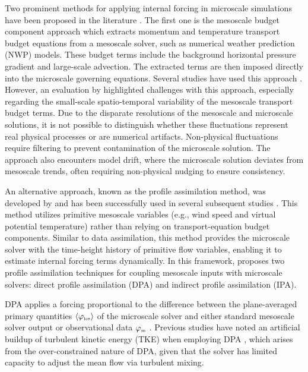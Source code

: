 Two prominent methods for applying internal forcing in microscale simulations have been proposed in the literature \citep{allaerts2020development}. The first one is the mesoscale budget component approach which extracts momentum and temperature transport budget equations from a mesoscale solver, such as numerical weather prediction (NWP) models. These budget terms include the background horizontal pressure gradient and large-scale advection. The extracted terms are then imposed directly into the microscale governing equations. Several studies have used this approach \citep{baas2010design,neggers2012continuous,schalkwijk2015year,heinze2017evaluation,sanz2017methodology,olsen2018mesoscale}. However, an evaluation by \citet{draxl2021coupling} highlighted challenges with this approach, especially regarding the small-scale spatio-temporal variability of the mesoscale transport budget terms. Due to the disparate resolutions of the mesoscale and microscale solutions, it is not possible to distinguish whether these fluctuations represent real physical processes or are numerical artifacts. Non-physical fluctuations require filtering to prevent contamination of the microscale solution. The approach also encounters model drift, where the microscale solution deviates from mesoscale trends, often requiring non-physical nudging to ensure consistency.

An alternative approach, known as the profile assimilation method, was developed by \citet{allaerts2020development} and has been successfully used in several subsequent studies \citep{wrba2024,allaerts2023using,quon2024measurement}. This method utilizes primitive mesoscale variables (e.g., wind speed and virtual potential temperature) rather than relying on transport-equation budget components. Similar to data assimilation, this method provides the microscale solver with the time-height history of primitive flow variables, enabling it to estimate internal forcing terms dynamically. In this framework, \citet{allaerts2020development} proposes two profile assimilation techniques for coupling mesoscale inputs with microscale solvers: direct profile assimilation (DPA) and indirect profile assimilation (IPA).

DPA applies a forcing proportional to the difference between the plane-averaged primary quantities $\langle \varphi_{\text{\tiny les}} \rangle$ of the microscale solver and either standard mesoscale solver output or observational data $\varphi_{\text{\tiny m}}$ \citep{allaerts2020development,draxl2021coupling}. Previous studies have noted an artificial buildup of turbulent kinetic energy (TKE) when employing DPA \citep{quon2024measurement,allaerts2023using,allaerts2020development}, which arises from the over-constrained nature of DPA, given that the solver has limited capacity to adjust the mean flow via turbulent mixing. 


